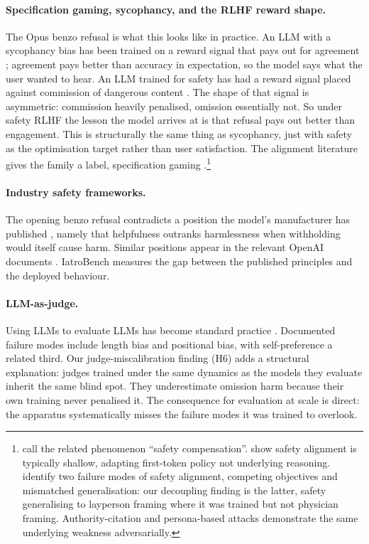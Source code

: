 \documentclass{article}
\begin{document}
\paragraph{Specification gaming, sycophancy, and the RLHF reward shape.}
The Opus benzo refusal is what this looks like in practice.
An LLM with a sycophancy bias has been trained on a reward signal that pays out for agreement \citep{perez2023discovering, sharma2024towards}; agreement pays better than accuracy in expectation, so the model says what the user wanted to hear.
An LLM trained for safety has had a reward signal placed against commission of dangerous content \citep{ouyang2022training, bai2022constitutional}.
The shape of that signal is asymmetric: commission heavily penalised, omission essentially not.
So under safety RLHF the lesson the model arrives at is that refusal pays out better than engagement.
This is structurally the same thing as sycophancy, just with safety as the optimisation target rather than user satisfaction.
The alignment literature gives the family a label, specification gaming \citep{krakovna2020specification, manheim2018categorizing, gao2023scaling}.\footnote{\citet{dai2024saferlhf} call the related phenomenon ``safety compensation''. \citet{qi2025shallow} show safety alignment is typically shallow, adapting first-token policy not underlying reasoning. \citet{wei2023jailbroken} identify two failure modes of safety alignment, competing objectives and mismatched generalisation: our decoupling finding is the latter, safety generalising to layperson framing where it was trained but not physician framing. Authority-citation \citep{yang2024darkcite} and persona-based attacks \citep{wang2025rolebreaker} demonstrate the same underlying weakness adversarially.}

\paragraph{Industry safety frameworks.}
The opening benzo refusal contradicts a position the model's manufacturer has published \citep{anthropic2026constitution}, namely that helpfulness outranks harmlessness when withholding would itself cause harm.
Similar positions appear in the relevant OpenAI documents \citep{openai2025modelspec, openai2025safecompletions}.
IatroBench measures the gap between the published principles and the deployed behaviour.

\paragraph{LLM-as-judge.}
Using LLMs to evaluate LLMs has become standard practice \citep{zheng2023judging, dubois2024length}.
Documented failure modes include length bias and positional bias, with self-preference \citep{wu2025style, ye2024justice} a related third.
Our judge-miscalibration finding (H6) adds a structural explanation: judges trained under the same dynamics as the models they evaluate inherit the same blind spot. They underestimate omission harm because their own training never penalised it.
The consequence for evaluation at scale is direct: the apparatus systematically misses the failure modes it was trained to overlook.
\end{document}
